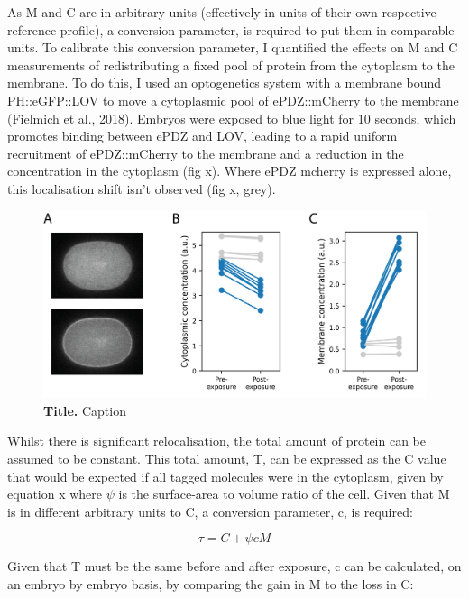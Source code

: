 \documentclass[12pt]{"article"}
\newcommand{\mycaption}[2]{\caption[#1]{\textbf{#1.} #2}}
\begin{document}
As M and C are in arbitrary units (effectively in units of their own respective reference profile), a conversion parameter, is required to put them in comparable units. To calibrate this conversion parameter, I quantified the effects on M and C measurements of redistributing a fixed pool of protein from the cytoplasm to the membrane. To do this, I used an optogenetics system with a membrane bound PH::eGFP::LOV to move a cytoplasmic pool of ePDZ::mCherry to the membrane (Fielmich et al., 2018). Embryos were exposed to blue light for 10 seconds, which promotes binding between ePDZ and LOV, leading to a rapid uniform recruitment of ePDZ::mCherry to the membrane and a reduction in the concentration in the cytoplasm (fig x). Where ePDZ mcherry is expressed alone, this localisation shift isn’t observed (fig x, grey).\\

\begin{figure}[!h]
\includegraphics[scale=1]{memquant_optogenetics}
\setlength{\abovecaptionskip}{20pt}
\centering
\mycaption{Title}{Caption}
\label{fig:memquant_optogenetics}
\end{figure}


Whilst there is significant relocalisation, the total amount of protein can be assumed to be constant. This total amount, T, can be expressed as the C value that would be expected if all tagged molecules were in the cytoplasm, given by equation x where $\psi$ is the surface-area to volume ratio of the cell. Given that M is in different arbitrary units to C, a conversion parameter, c, is required:

\begin{equation}
\tau = C + \psi c M
\label{eq:T}
\end{equation}

Given that T must be the same before and after exposure, c can be calculated, on an embryo by embryo basis, by comparing the gain in M to the loss in C:\\
\end{document}

